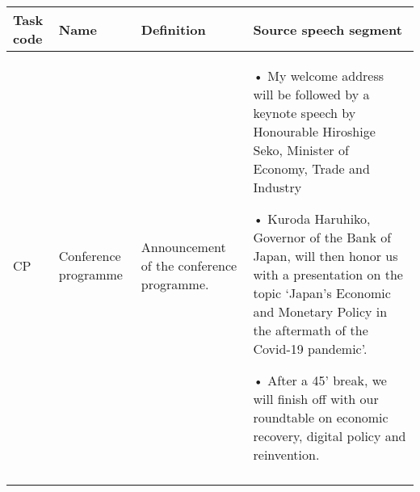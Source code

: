 \begin{sidewaystable}
\small
\begin{tabularx}{\textwidth}{l>{\raggedright\arraybackslash}p{}QQ}
\midrule
{Task code}   & {Name} & {Definition}  & {Source speech segment} \\ 
\midrule
CP  &  Conference programme                                               & Announcement of the conference programme.  & •   My welcome address will be followed by a keynote speech by Honourable Hiroshige Seko, Minister of Economy, Trade and Industry

•   Kuroda Haruhiko, Governor of the Bank of Japan, will then honor us with a presentation on the topic `Japan's Economic and Monetary Policy in the aftermath of the Covid-19 pandemic'.

•   After a 45' break, we will finish off with our roundtable on economic recovery, digital policy and reinvention. \\ 
\lspbottomrule
                    
\end{tabularx}

\end{sidewaystable}
